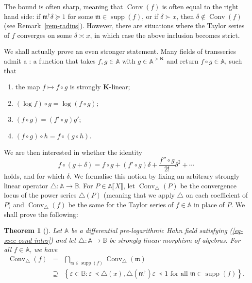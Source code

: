 \documentclass{article}
\newcommand{\of}{:}
\newcommand{\suchthat}{:}
\newcommand{\tmem}[1]{{\em #1\/}}
\newcommand{\tmop}[1]{\ensuremath{\operatorname{#1}}}
\newcommand{\tmtextit}[1]{\text{{\itshape{#1}}}}
\newtheorem{maintheorem}{Theorem}
\theoremstyle{remark}\newtheorem*{convention*}{Convention}
\begin{document}
The bound is often sharp, meaning that $\tmop{Conv} (f)$ is often equal to the
right hand side: if $\mathfrak{m}^{\dag} \delta \succcurlyeq 1$ for some
$\mathfrak{m} \in \tmop{supp} (f)$, or if $\delta \succ x$, then $\delta
\notin \tmop{Conv} (f)$ (see Remark~\ref{rem-radius}). However, there are situations
where the Taylor series of $f$ converges on some $\delta \asymp x$, in which
case the above inclusion becomes strict.

We shall actually prove an even stronger statement. Many fields of
transseries admit a \tmtextit{composition law}: a function that takes $f, g
\in \mathbb{A}$ with $g \in \mathbb{A}^{> \mathbf{K}}$ and
return $f \circ g \in \mathbb{A}$, such that
\begin{enumerate}
  \item the map $f \mapsto f \circ g$ is strongly $\mathbf{K}$-linear;
  
  \item $(\log f) \circ g = \log (f \circ g)$;
  
  \item $(f \circ g) = (f' \circ g) g'$;
  
  \item $(f \circ g) \circ h = f \circ (g \circ h)$.
\end{enumerate}
We are then interested in whether the identity
\[ f \circ (g + \delta) = f \circ g + (f' \circ g) \delta + \frac{f'' \circ
   g}{2!} \delta^2 + \cdots \]
holds, and for which $\delta$. We formalise this notion by fixing an arbitrary
strongly linear operator $\triangle \of \mathbb{A} \rightarrow \mathbb{B}$.
For $P \in \mathbb{A} \llbracket X \rrbracket$, let $\tmop{Conv}_{\triangle}
(P)$ be the convergence locus of the power series $\triangle (P)$ (meaning
that we apply $\triangle$ on each coefficient of $P$) and
$\tmop{Conv}_{\triangle} (f)$ be the same for the Taylor series of $f \in
\mathbb{A}$ in place of $P$. We shall prove the following:

\begin{maintheorem}[]\label{main:conv-triangle}
  Let $\mathbb{A}$ be a differential pre-logarithmic Hahn field satisfying {\tmem{(\ref{eq-spec-cond-intro})}} and let $\triangle \of \mathbb{A}
  \rightarrow \mathbb{B}$ be strongly linear morphism of algebras. For all $f
  \in \mathbb{A}$, we have
  \begin{eqnarray*}\tmop{Conv}_{\triangle} (f) & =  & \bigcap_{\mathfrak{m} \in \tmop{supp} (f)}
     \tmop{Conv}_{\triangle} (\mathfrak{m}) \\ & \supseteq & \left\{ \varepsilon \in
     \mathbb{B} \suchthat \varepsilon \prec \triangle (x), \triangle
     (\mathfrak{m}^{\dagger}) \varepsilon \prec 1 \text{ for all }
     \mathfrak{m} \in \tmop{supp} (f)  \right\} . \end{eqnarray*}
\end{maintheorem}
\end{document}
